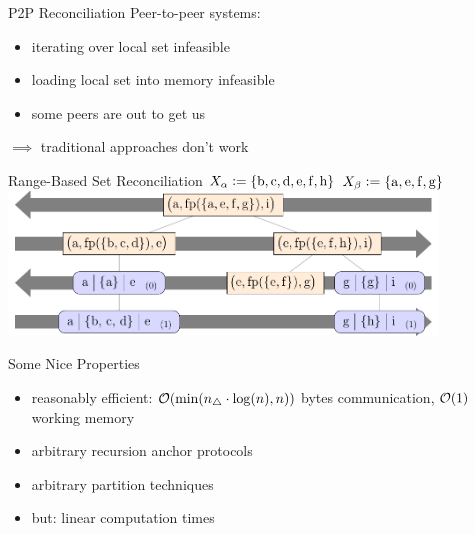 \documentclass{beamer}
\begin{document}
\begin{frame}{P2P Reconciliation}
    Peer-to-peer systems:
    \begin{itemize}
        \item iterating over local set infeasible
        \item loading local set into memory infeasible
        \item some peers are out to get us
    \end{itemize}

    \pause

    $\implies$ traditional approaches don't work
\end{frame}

\begin{frame}{Range-Based Set Reconciliation}
    $X_{\alpha} \vcentcolon= \{\mathrm{b}, \mathrm{c}, \mathrm{d}, \mathrm{e}, \mathrm{f}, \mathrm{h} \}$
    \hfill
    $X_{\beta} \vcentcolon= \{\mathrm{a}, \mathrm{e}, \mathrm{f}, \mathrm{g}\}$
    \includegraphics[keepaspectratio=true,width=11.4cm]{examplerun.pdf}

\end{frame}

\begin{frame}{Some Nice Properties}
    \begin{itemize}
        \item reasonably efficient: $\mathcal{O}(\min(n_{\triangle} \cdot \log(n), n))$ bytes communication, $\mathcal{O}(1)$ working memory
        \item arbitrary recursion anchor protocols
        \item arbitrary partition techniques \pause
        \item but: linear computation times
    \end{itemize}
\end{frame}

\end{document}
